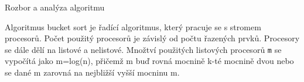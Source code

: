Rozbor a analýza algoritmu

Algoritmus bucket sort je řadící algoritmus, který pracuje se s stromem procesorů. Počet použitý procesorů je závislý od počtu řazených prvků. Procesory se dále dělí na listové a nelistové. Množtví použitých listových procesorů \texttt{m} se vypočítá jako m=log(n), přičemž m buď rovná mocnině k-té mocnině dvou nebo se dané m zarovná na nejbližší vyšší mocninu m.  
